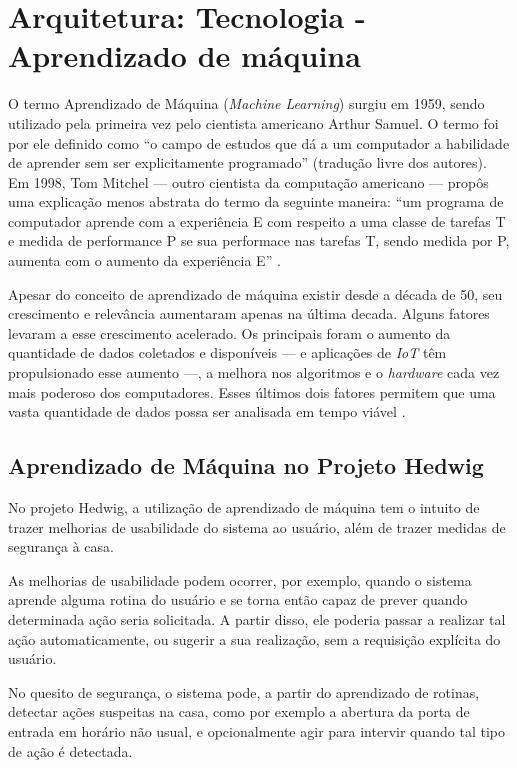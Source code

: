 \chapter{Arquitetura: Tecnologia - Aprendizado de máquina}

	O termo Aprendizado de Máquina (\emph{Machine Learning}) surgiu em 1959, sendo utilizado pela primeira vez  pelo cientista americano Arthur Samuel. O termo foi por ele definido como ``o campo de estudos que dá a um computador a habilidade de aprender sem ser explicitamente programado'' (tradução livre dos autores). Em 1998, Tom Mitchel --- outro cientista da computação americano --- propôs uma explicação menos abstrata do termo da seguinte maneira: ``um programa de computador aprende com a experiência E com respeito a uma classe de tarefas T e medida de performance P se sua performace nas tarefas T, sendo medida por P, aumenta com o aumento da experiência E'' \cite{Coursera}.

	Apesar do conceito de aprendizado de máquina existir desde a década de 50, seu crescimento e relevância aumentaram apenas na última decada. Alguns fatores levaram a esse crescimento acelerado. Os principais foram o aumento da quantidade de dados coletados e disponíveis --- e aplicações de \emph{IoT} têm propulsionado esse aumento ---, a melhora nos algoritmos e o \emph{hardware} cada vez mais poderoso dos computadores. Esses últimos dois fatores permitem que uma vasta quantidade de dados possa ser analisada em tempo viável \cite{hbrMlExplosion}.

	\section{Aprendizado de Máquina no Projeto Hedwig \label{aprendizadoDeMaquinaNoProjetoHedwig}}

		No projeto Hedwig, a utilização de aprendizado de máquina tem o intuito de trazer melhorias de usabilidade do sistema ao usuário, além de trazer medidas de segurança à casa.

		As melhorias de usabilidade podem ocorrer, por exemplo, quando o sistema aprende alguma rotina do usuário e se torna então capaz de prever quando determinada ação seria solicitada. A partir disso, ele poderia passar a realizar tal ação automaticamente, ou sugerir a sua realização, sem a requisição explícita do usuário.

		No quesito de segurança, o sistema pode, a partir do aprendizado de rotinas, detectar ações suspeitas na casa, como por exemplo a abertura da porta de entrada em horário não usual, e opcionalmente agir para intervir quando tal tipo de ação é detectada.

